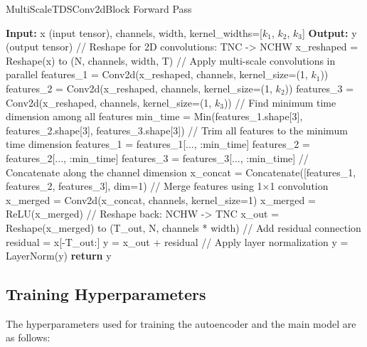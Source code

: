 \begin{algorithm}
    \caption{MultiScaleTDSConv2dBlock Forward Pass}
    \begin{algorithmic}[1]
        \STATE \textbf{Input:} x (input tensor), channels, width, kernel\_widths=[$k_1$, $k_2$, $k_3$]
        \STATE \textbf{Output:} y (output tensor)
        \STATE // Reshape for 2D convolutions: TNC -> NCHW
        \STATE x\_reshaped = Reshape(x) to (N, channels, width, T)
        \STATE // Apply multi-scale convolutions in parallel
        \STATE features\_1 = Conv2d(x\_reshaped, channels, kernel\_size=(1, $k_1$))
        \STATE features\_2 = Conv2d(x\_reshaped, channels, kernel\_size=(1, $k_2$))
        \STATE features\_3 = Conv2d(x\_reshaped, channels, kernel\_size=(1, $k_3$))
        \STATE // Find minimum time dimension among all features
        \STATE min\_time = Min(features\_1.shape[3], features\_2.shape[3], features\_3.shape[3])
        \STATE // Trim all features to the minimum time dimension
        \STATE features\_1 = features\_1[..., :min\_time]
        \STATE features\_2 = features\_2[..., :min\_time]
        \STATE features\_3 = features\_3[..., :min\_time]
        \STATE // Concatenate along the channel dimension
        \STATE x\_concat = Concatenate([features\_1, features\_2, features\_3], dim=1)
        \STATE // Merge features using 1×1 convolution
        \STATE x\_merged = Conv2d(x\_concat, channels, kernel\_size=1)
        \STATE x\_merged = ReLU(x\_merged)
        \STATE // Reshape back: NCHW -> TNC
        \STATE x\_out = Reshape(x\_merged) to (T\_out, N, channels * width)
        \STATE // Add residual connection
        \STATE residual = x[-T\_out:]
        \STATE y = x\_out + residual
        \STATE // Apply layer normalization
        \STATE y = LayerNorm(y)
        \STATE \textbf{return} y
    \end{algorithmic}
\end{algorithm}

\subsection{Training Hyperparameters}

The hyperparameters used for training the autoencoder and the main model are as follows:

